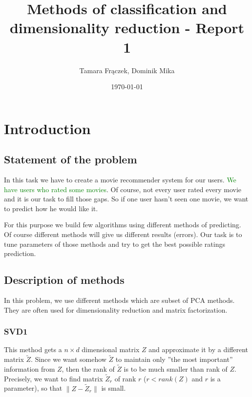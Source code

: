 \documentclass[11pt]{amsart}
\author{Tamara Frączek, Dominik Mika}
\title{Methods of classification and dimensionality reduction - Report 1}
\date{\today}
\newcommand{\domi}[1]{{\textcolor{green}{#1}}}
\begin{document}
\maketitle


\section{Introduction}

\subsection*{Statement of the problem}

In this task we have to create a movie recommender system for our users.
\domi{We have users who rated some movies}.
Of course, not every user rated every movie and it is our task to fill those gaps.
So if one user hasn't seen one movie, we want to predict how he would like it.





For this purpose we build few algorithms using different methods of predicting.
Of course different methods will give us different results (errors).
Our task is to tune parameters of those methods and try to get the best possible ratings prediction.



\subsection*{Description of methods}

In this problem, we use different methods which are subset of PCA methods. They are often used for dimensionality reduction and matrix factorization.

\subsubsection*{SVD1}

This method gets a $n \times d$ dimensional matrix $Z$ and approximate it by a different matrix $\tilde{Z}$.
Since we want somehow $\tilde{Z}$ to maintain only ''the most important'' information from $Z$, then the rank of $\tilde{Z}$ is to be much smaller than rank of $Z$.
Precisely, we want to find matrix $\tilde{Z}_r$ of rank $r$ ($r < rank(Z)$ and $r$ is a parameter), so that $\|Z - \tilde{Z}_r\|$ is small.
\end{document}
